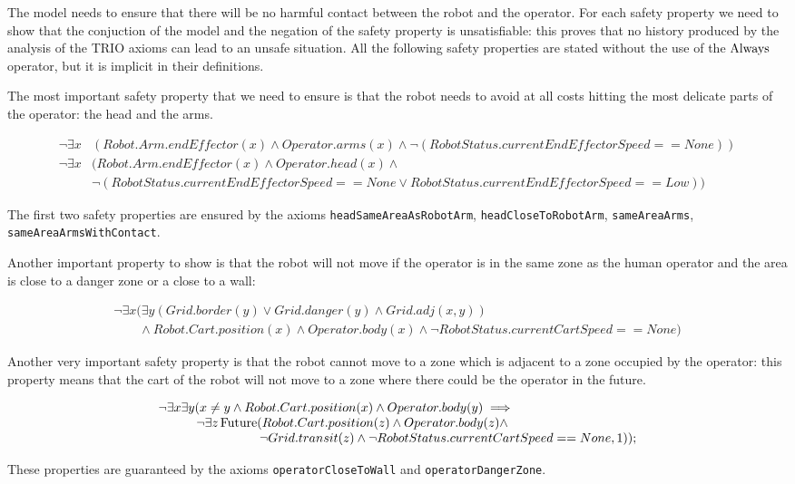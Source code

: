 The model needs to ensure that there will be no harmful contact between the robot and the operator. For each safety property we need to show that the conjuction of the model and the negation of the safety property is unsatisfiable: this proves that no history produced by the analysis of the TRIO axioms can lead to an unsafe situation. All the following safety properties are stated without the use of the $\operatorname{Always}$ operator, but it is implicit in their definitions.

The most important safety property that we need to ensure is that the robot needs to avoid at all costs hitting the most delicate parts of the operator: the head and the arms.

\begin{align*}
\neg \exists x &(Robot.Arm.endEffector(x) \land Operator.arms(x) \land \neg (RobotStatus.currentEndEffectorSpeed == None)) \\
\neg \exists x &(Robot.Arm.endEffector(x) \land Operator.head(x) \land \\
&\neg (RobotStatus.currentEndEffectorSpeed == None \lor RobotStatus.currentEndEffectorSpeed == Low)) 
\end{align*}

The first two safety properties are ensured by the axioms \texttt{headSameAreaAsRobotArm}, \texttt{headCloseToRobotArm}, \texttt{sameAreaArms}, \texttt{sameAreaArmsWithContact}.

Another important property to show is that the robot will not move if the operator is in the same zone as the human operator and the area is close to a danger zone or a close to a wall:

\begin{equation*}
  \begin{array}{l}
  \neg \exists x (\exists y (Grid.border(y) \lor Grid.danger(y) \land Grid.adj(x, y)) \\
  \qquad \land Robot.Cart.position(x) \land Operator.body(x) \land \neg RobotStatus.currentCartSpeed == None)
  \end{array}
\end{equation*}

Another very important safety property is that the robot cannot move to a zone which is adjacent to a zone occupied by the operator: this property means that the cart of the robot will not move to a zone where there could be the operator in the future.

\begin{equation*}
  \begin{array}{lll}
  \neg \exists x \exists y (x \neq y \land Robot.Cart.position(x) \land Operator.body(y) \implies \\
  \qquad \quad \neg \exists z \operatorname{Future}(Robot.Cart.position(z) \land Operator.body(z) \land \\
  \qquad \qquad \qquad \qquad \neg Grid.transit(z) \land \neg RobotStatus.currentCartSpeed == None, 1));
  \end{array}
\end{equation*}

These properties are guaranteed by the axioms \texttt{operatorCloseToWall} and \texttt{operatorDangerZone}.

